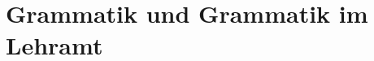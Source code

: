 \documentclass[handout,aspectratio=1610,dvipsnames]{beamer}
\begin{document}
  \section[Grammatik]{Grammatik und Grammatik im Lehramt}
  \let\woopsi\section\let\section\subsection\let\subsection\subsubsection
  
  \let\subsection\section\let\section\woopsi
\end{document}
